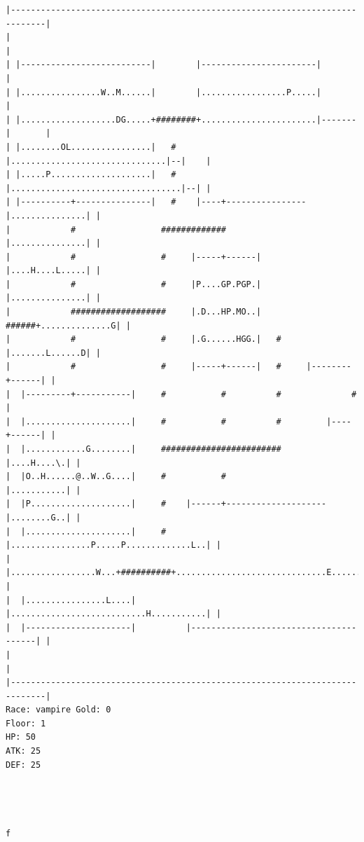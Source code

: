 \documentclass[11pt]{article}
\theoremstyle{plain}
\begin{document}
\begin{Verbatim}[fontsize=\scriptsize]
|-----------------------------------------------------------------------------|
|                                                                             |
| |--------------------------|        |-----------------------|               |
| |................W..M......|        |.................P.....|               |
| |...................DG.....+########+.......................|-------|       |
| |........OL................|   #    |...............................|--|    |
| |.....P....................|   #    |..................................|--| |
| |----------+---------------|   #    |----+----------------|...............| |
|            #                 #############                |...............| |
|            #                 #     |-----+------|         |....H....L.....| |
|            #                 #     |P....GP.PGP.|         |...............| |
|            ###################     |.D...HP.MO..|   ######+..............G| |
|            #                 #     |.G......HGG.|   #     |.......L......D| |
|            #                 #     |-----+------|   #     |--------+------| |
|  |---------+-----------|     #           #          #              #        |
|  |.....................|     #           #          #         |----+------| |
|  |............G........|     ########################         |....H....\.| |
|  |O..H......@..W..G....|     #           #                    |...........| |
|  |P....................|     #    |------+--------------------|........G..| |
|  |.....................|     #    |................P.....P.............L..| |
|  |.................W...+##########+..............................E........| |
|  |................L....|          |...........................H...........| |
|  |---------------------|          |---------------------------------------| |
|                                                                             |
|-----------------------------------------------------------------------------|
Race: vampire Gold: 0                                                  Floor: 1
HP: 50
ATK: 25
DEF: 25




f


\end{Verbatim}
\end{document}
